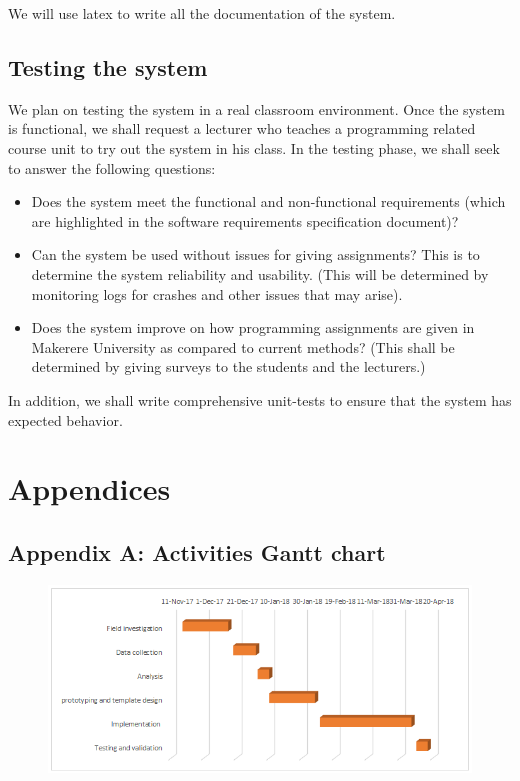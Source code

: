 \documentclass[12pt]{article}
\begin{document}
		\noindent We will use latex to write all the documentation of the system.
	
	\subsection{Testing the system}
	We plan on testing the system in a real classroom environment. Once the system is functional, we shall request a lecturer who teaches a programming related course unit to try out the system in his class. In the testing phase, we shall seek to answer the following questions:
	\begin{itemize}
		\item Does the system meet the functional and non-functional requirements (which are highlighted in the software requirements specification document)?
		\item Can the system be used without issues for giving assignments? This is to determine the system reliability and usability. (This will be determined by monitoring logs for crashes and other issues that may arise).
		\item Does the system improve on how programming assignments are given in Makerere University as compared to current methods? (This shall be determined by giving surveys to the students and the lecturers.)
	\end{itemize}
	
	In addition, we shall write comprehensive unit-tests to ensure that the system has expected behavior.

\newpage


\newpage
\section{Appendices}
\subsection{Appendix A: Activities Gantt chart}
\begin{figure}[h]
	\begin{center} \includegraphics[width=1\linewidth]{gantt.png} \end{center}
\end{figure}
\end{document}
